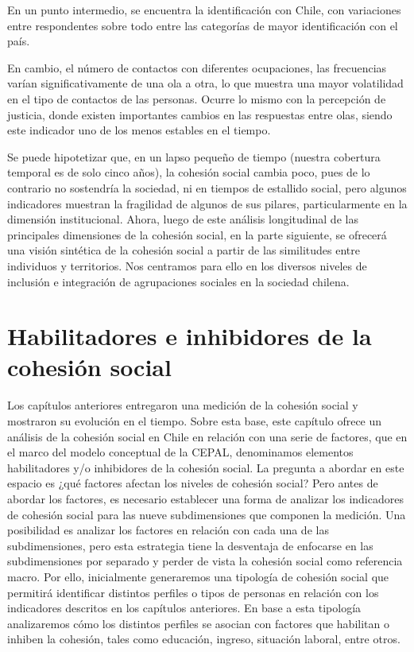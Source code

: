 \documentclass[
  12pt,
]{book}
\begin{document}
En un punto intermedio, se encuentra la identificación con Chile, con variaciones entre respondentes sobre todo entre las categorías de mayor identificación con el país.

En cambio, el número de contactos con diferentes ocupaciones, las frecuencias varían significativamente de una ola a otra, lo que muestra una mayor volatilidad en el tipo de contactos de las personas. Ocurre lo mismo con la percepción de justicia, donde existen importantes cambios en las respuestas entre olas, siendo este indicador uno de los menos estables en el tiempo.

Se puede hipotetizar que, en un lapso pequeño de tiempo (nuestra cobertura temporal es de solo cinco años), la cohesión social cambia poco, pues de lo contrario no sostendría la sociedad, ni en tiempos de estallido social, pero algunos indicadores muestran la fragilidad de algunos de sus pilares, particularmente en la dimensión institucional. Ahora, luego de este análisis longitudinal de las principales dimensiones de la cohesión social, en la parte siguiente, se ofrecerá una visión sintética de la cohesión social a partir de las similitudes entre individuos y territorios. Nos centramos para ello en los diversos niveles de inclusión e integración de agrupaciones sociales en la sociedad chilena.

\hypertarget{habilitadores-e-inhibidores-de-la-cohesiuxf3n-social}{%
\chapter{Habilitadores e inhibidores de la cohesión social}\label{habilitadores-e-inhibidores-de-la-cohesiuxf3n-social}}

Los capítulos anteriores entregaron una medición de la cohesión social y mostraron su evolución en el tiempo. Sobre esta base, este capítulo ofrece un análisis de la cohesión social en Chile en relación con una serie de factores, que en el marco del modelo conceptual de la CEPAL, denominamos elementos habilitadores y/o inhibidores de la cohesión social. La pregunta a abordar en este espacio es ¿qué factores afectan los niveles de cohesión social? Pero antes de abordar los factores, es necesario establecer una forma de analizar los indicadores de cohesión social para las nueve subdimensiones que componen la medición. Una posibilidad es analizar los factores en relación con cada una de las subdimensiones, pero esta estrategia tiene la desventaja de enfocarse en las subdimensiones por separado y perder de vista la cohesión social como referencia macro. Por ello, inicialmente generaremos una tipología de cohesión social que permitirá identificar distintos perfiles o tipos de personas en relación con los indicadores descritos en los capítulos anteriores. En base a esta tipología analizaremos cómo los distintos perfiles se asocian con factores que habilitan o inhiben la cohesión, tales como educación, ingreso, situación laboral, entre otros.
\end{document}
